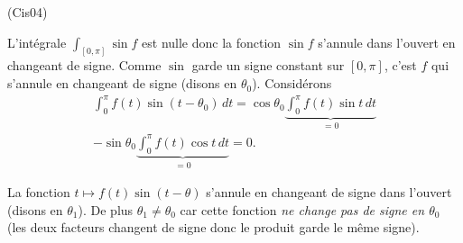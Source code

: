 \begin{tiny}(Cis04)\end{tiny} L'intégrale $\int_{\left[ 0,\pi\right] } \sin f$ est nulle donc la fonction $\sin f$ s'annule dans l'ouvert en changeant de signe. Comme $\sin$ garde un signe constant sur $\left[ 0, \pi\right]$, c'est $f$ qui s'annule en changeant de signe (disons en $\theta_0$).\newline
Considérons 
\begin{multline*}
 \int_0^\pi
f(t) \sin(t-\theta_0)\,dt = 
\cos \theta_0 \underset{= 0}{\underbrace{\int_0^\pi f(t)\sin t\, dt}} \\
- \sin \theta_0  \underset{= 0 }{\underbrace{\int_0^\pi f(t)\cos t\, dt}}
= 0.
\end{multline*}

La fonction $t\mapsto f(t) \sin(t-\theta)$ s'annule en changeant de signe dans l'ouvert (disons en $\theta_1$). De plus $\theta_1 \neq \theta_0$ car cette fonction \emph{ne change pas de signe en $\theta_0$} (les deux facteurs changent de signe donc le produit garde le même signe). 
